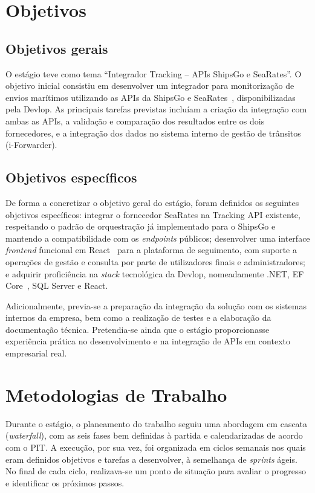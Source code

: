 \documentclass[a4paper,12pt]{report}
\begin{document}
\section{Objetivos}

\subsection{Objetivos gerais}

O estágio teve como tema \enquote{Integrador Tracking -- APIs ShipsGo e SeaRates}. O objetivo inicial consistiu em desenvolver um integrador para monitorização de envios marítimos utilizando as APIs da ShipsGo e SeaRates~\cite{searates}, disponibilizadas pela Devlop. As principais tarefas previstas incluíam a criação da integração com ambas as APIs, a validação e comparação dos resultados entre os dois fornecedores, e a integração dos dados no sistema interno de gestão de trânsitos (i-Forwarder).

\subsection{Objetivos específicos}

De forma a concretizar o objetivo geral do estágio, foram definidos os seguintes objetivos específicos: integrar o fornecedor SeaRates na Tracking API existente, respeitando o padrão de orquestração já implementado para o ShipsGo e mantendo a compatibilidade com os \textit{endpoints} públicos; desenvolver uma interface \textit{frontend} funcional em React~\cite{react} para a plataforma de seguimento, com suporte a operações de gestão e consulta por parte de utilizadores finais e administradores; e adquirir proficiência na \textit{stack} tecnológica da Devlop, nomeadamente .NET, EF Core~\cite{efcore}, SQL Server e React.

Adicionalmente, previa-se a preparação da integração da solução com os sistemas internos da empresa, bem como a realização de testes e a elaboração da documentação técnica. Pretendia-se ainda que o estágio proporcionasse experiência prática no desenvolvimento e na integração de APIs em contexto empresarial real.

\section{Metodologias de Trabalho}

Durante o estágio, o planeamento do trabalho seguiu uma abordagem em cascata (\textit{waterfall}), com as seis fases bem definidas à partida e calendarizadas de acordo com o PIT. A execução, por sua vez, foi organizada em ciclos semanais nos quais eram definidos objetivos e tarefas a desenvolver, à semelhança de \textit{sprints} ágeis. No final de cada ciclo, realizava-se um ponto de situação para avaliar o progresso e identificar os próximos passos.
\end{document}
